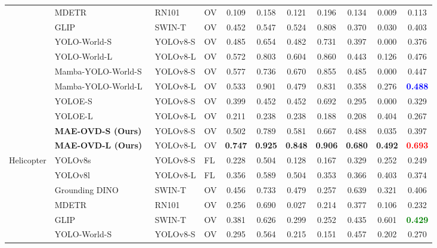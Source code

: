 \documentclass[letterpaper, 10 pt, conference]{ieeeconf}  %
\begin{document}
\begin{table}[!p]
\begin{tabular}{l|lll|cccccc|c}
 & MDETR~\cite{kamath2021mdetr} & RN101 & OV & 0.109 & 0.158 & 0.121 & 0.196 & 0.134 & 0.009 & 0.113 \\
 & GLIP~\cite{li2022glip} & SWIN-T & OV & 0.452 & 0.547 & 0.524 & 0.808 & 0.370 & 0.030 & 0.403 \\
 & YOLO-World-S~\cite{cheng2024yoloworld} & YOLOv8-S & OV & 0.485 & 0.654 & 0.482 & 0.731 & 0.397 & 0.000 & 0.376 \\
 & YOLO-World-L~\cite{cheng2024yoloworld} & YOLOv8-L & OV & 0.572 & 0.803 & 0.604 & 0.860 & 0.443 & 0.126 & 0.476 \\
 & Mamba-YOLO-World-S~\cite{wang2025mambayoloworld} & YOLOv8-S & OV & 0.577 & 0.736 & 0.670 & 0.855 & 0.485 & 0.000 & 0.447 \\
 & Mamba-YOLO-World-L~\cite{wang2025mambayoloworld} & YOLOv8-L & OV & 0.533 & 0.901 & 0.479 & 0.831 & 0.358 & 0.276 & \textbf{\textcolor{blue}{0.488}} \\
 & YOLOE-S~\cite{wang2025yoloe} & YOLOv8-S & OV & 0.399 & 0.452 & 0.452 & 0.692 & 0.295 & 0.000 & 0.329 \\
 & YOLOE-L~\cite{wang2025yoloe} & YOLOv8-L & OV & 0.211 & 0.238 & 0.238 & 0.188 & 0.208 & 0.404 & 0.267 \\
\hhline{~----------}
\rowcolor{gray!15}\cellcolor{white} & \textbf{MAE-OVD-S (Ours)} & YOLOv8-S & OV & 0.502 & 0.789 & 0.581 & 0.667 & 0.488 & 0.035 & 0.397 \\
\rowcolor{gray!15}\cellcolor{white} & \textbf{MAE-OVD-L (Ours)} & YOLOv8-L & OV & \textbf{0.747} & \textbf{0.925} & \textbf{0.848} & \textbf{0.906} & \textbf{0.680} & \textbf{0.492} & \textbf{\textcolor{red}{0.693}} \\
\hline\hline
\multirow{13}{*}{Helicopter} & YOLOv8s & YOLOv8-S & FL & 0.228 & 0.504 & 0.128 & 0.167 & 0.329 & 0.252 & 0.249 \\
 & YOLOv8l & YOLOv8-L & FL & 0.356 & 0.589 & 0.504 & 0.353 & 0.366 & 0.403 & 0.374 \\
\cline{2-11}
 & Grounding DINO~\cite{liu2024groundingdino} & SWIN-T & OV & 0.456 & 0.733 & 0.479 & 0.257 & 0.639 & 0.321 & 0.406 \\
 & MDETR~\cite{kamath2021mdetr} & RN101 & OV & 0.256 & 0.690 & 0.027 & 0.214 & 0.377 & 0.106 & 0.232 \\
 & GLIP~\cite{li2022glip} & SWIN-T & OV & 0.381 & 0.626 & 0.299 & 0.252 & 0.435 & 0.601 & \textbf{\textcolor{green}{0.429}} \\
 & YOLO-World-S~\cite{cheng2024yoloworld} & YOLOv8-S & OV & 0.295 & 0.564 & 0.215 & 0.151 & 0.457 & 0.202 & 0.270 \\

\end{tabular}
\end{table}
\end{document}
